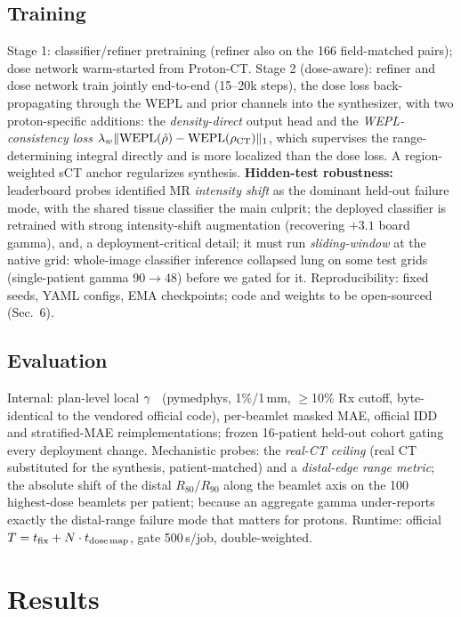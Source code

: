 \documentclass{llncs}
\begin{document}
\subsection{Training}
Stage 1: classifier/refiner pretraining (refiner also on the 166 field-matched pairs); dose
network warm-started from Proton-CT. Stage 2 (dose-aware): refiner and dose network train
jointly end-to-end (15--20k steps), the dose loss back-propagating through the WEPL and prior
channels into the synthesizer, with two proton-specific additions: the \emph{density-direct}
output head and the \emph{WEPL-consistency loss}
$\lambda_w\lVert\mathrm{WEPL}(\hat\rho)-\mathrm{WEPL}(\rho_{\rm CT})\rVert_1$, which supervises
the range-determining integral directly and is more localized than the dose loss. A
region-weighted sCT anchor regularizes synthesis. \textbf{Hidden-test robustness:} leaderboard
probes identified MR \emph{intensity shift} as the dominant held-out failure mode, with the
shared tissue classifier the main culprit; the deployed classifier is retrained with strong
intensity-shift augmentation (recovering $+3.1$ board gamma), and, a deployment-critical
detail; it must run \emph{sliding-window} at the native grid: whole-image classifier inference
collapsed lung on some test grids (single-patient gamma 90$\to$48) before we gated for it.
Reproducibility: fixed seeds, YAML configs, EMA checkpoints; code and weights to be open-sourced
(Sec.~6).

\subsection{Evaluation}
Internal: plan-level local $\gamma$~\cite{gamma} (pymedphys, 1\%/1\,mm, $\ge$10\% Rx cutoff,
byte-identical to the vendored official code), per-beamlet masked MAE, official IDD and
stratified-MAE reimplementations; frozen 16-patient held-out cohort gating every deployment
change. Mechanistic probes: the \emph{real-CT ceiling} (real CT substituted for the synthesis,
patient-matched) and a \emph{distal-edge range metric}; the absolute shift of the distal
$R_{80}$/$R_{90}$ along the beamlet axis on the 100 highest-dose beamlets per patient; because
an aggregate gamma under-reports exactly the distal-range failure mode that matters for protons.
Runtime: official $T=t_{\rm fix}+N\cdot t_{\rm dose\,map}$, gate 500\,s/job, double-weighted.

\section{Results}
\end{document}
